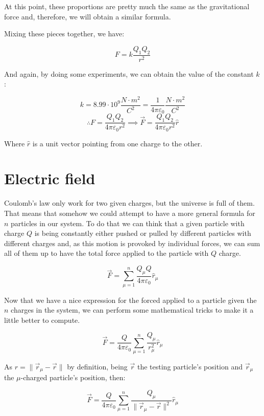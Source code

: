 \documentclass[12pt]{article}
\begin{document}
	At this point, these proportions are pretty much the same as the gravitational force and, therefore, we will obtain a similar formula.
	
	Mixing these pieces together, we have:
	
	\[
		F = k \frac{Q_1 Q_2}{r^2}
	\]
	
	And again, by doing some experiments, we can obtain the value of the constant $k$:
	
	\[
		k = 8.99 \cdot 10^9 \frac{N \cdot m^2}{C^2} = \frac{1}{4 \pi \varepsilon_0} \frac{N \cdot m^2}{C^2}
	\]
	\[
		\therefore F = \frac{Q_1 Q_2}{4 \pi \varepsilon_0 r^2}
		\implies \vec{F} = \frac{Q_1 Q_2}{4 \pi \varepsilon_0 r^2} \hat{r}
	\]
	
	Where $\hat{r}$ is a unit vector pointing from one charge to the other.
	
	
	\section{Electric field}
	
	Coulomb's law only work for two given charges, but the universe is full of them. That means that somehow we could attempt to have a more general formula for $n$ particles in our system. To do that we can think that a given particle with charge $Q$ is being constantly either pushed or pulled by different particles with different charges and, as this motion is provoked by individual forces, we can sum all of them up to have the total force applied to the particle with $Q$ charge.
	
	\[
		\vec{F} = \sum_{\mu = 1}^n \frac{Q_\mu Q}{4 \pi \varepsilon_0} \hat{r}_\mu
	\]
	
	Now that we have a nice expression for the forced applied to a particle given the $n$ charges in the system, we can perform some mathematical tricks to make it a little better to compute.
	
	\[
		\vec{F}
		= \frac{Q}{4 \pi \varepsilon_0} \sum_{\mu = 1}^n \frac{Q_\mu}{r_\mu^2} \hat{r}_\mu
	\]
	
	As $r = \|\vec{r}_\mu - \vec{r}\|$ by definition, being $\vec{r}$ the testing particle's position and $\vec{r}_\mu$ the $\mu$-charged particle's position, then:
	
	\[
		\vec{F}
		= \frac{Q}{4 \pi \varepsilon_0} \sum_{\mu = 1}^n \frac{Q_\mu}{\|\vec{r}_\mu - \vec{r}\|^2} \hat{r}_\mu
	\]
	
\end{document}
